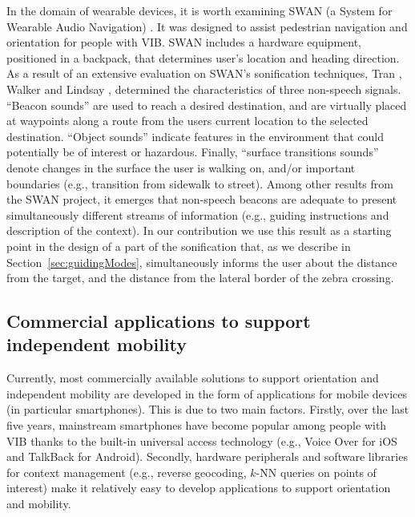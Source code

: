 \documentclass{article}
\begin{document}
In the domain of wearable devices, it is worth examining SWAN (a System for Wearable Audio Navigation) \cite{wilson2007}.
It was designed to assist pedestrian navigation and orientation for people with VIB.
SWAN includes a hardware equipment, positioned in a backpack, that determines user's location and heading direction.
As a result of an extensive evaluation on SWAN's sonification techniques, Tran \cite{tran}, Walker and Lindsay \cite{walker_lindsay}, \cite{wilson2007} determined the characteristics of three non-speech signals. ``Beacon sounds'' are used to reach a desired destination, and are virtually placed at waypoints along a route from the users current location to the selected destination.
``Object sounds'' indicate features in the environment that could potentially be of interest or hazardous.
Finally, ``surface transitions sounds'' denote changes in the surface the user is walking on, and/or important boundaries (e.g., transition from sidewalk to street).
Among other results from the SWAN project, it emerges that non-speech beacons are adequate to present simultaneously different streams of information (e.g., guiding instructions and description of the context).
In our contribution we use this result as a starting point in the design of a part of the sonification that, as we describe in Section~\ref{sec:guidingModes}, simultaneously informs the user about the distance from the target, and the distance from the lateral border of the zebra crossing.

\subsection{Commercial applications to support independent mobility}
\label{sub:apps}
Currently, most commercially available solutions to support orientation and independent mobility are developed in the form of applications for mobile devices (in particular smartphones).
This is due to two main factors. Firstly, over the last five years, mainstream smartphones have become popular among people with VIB thanks to the built-in universal access technology (e.g., Voice Over for iOS and TalkBack for Android).
Secondly, hardware peripherals and software libraries for context management (e.g., reverse geocoding, $k$-NN queries on points of interest) make it relatively easy to develop applications to support orientation and mobility.
\end{document}
